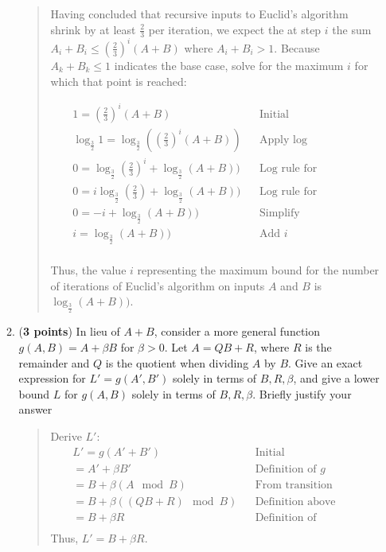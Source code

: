\documentclass[11pt]{article}
\begin{document}
\begin{enumerate}[leftmargin=*]
\begin{enumerate}
\begin{quote}
        \medskip
        Having concluded that recursive inputs to Euclid's algorithm shrink by at least $\frac{2}{3}$ per iteration, we expect the at step $i$ the sum $A_i + B_i \leq (\frac{2}{3})^i(A + B)$ where $A_i + B_i > 1$. Because $A_k + B_k \leq 1$ indicates the base case, solve for the maximum $i$ for which that point is reached:

        \begin{align*}
            && 1 = (\frac{2}{3})^i(A + B) && \text{Initial} && \\
            && \log_{\frac{3}{2}}1 = \log_{\frac{3}{2}}((\frac{2}{3})^i(A + B)) && \text{Apply log} && \\
            && 0 = \log_{\frac{3}{2}}(\frac{2}{3})^i + \log_{\frac{3}{2}}(A + B)) && \text{Log rule for multiplication} && \\
            && 0 = i\log_{\frac{3}{2}}(\frac{2}{3}) + \log_{\frac{3}{2}}(A + B)) && \text{Log rule for exponents} && \\
            && 0 = -i + \log_{\frac{3}{2}}(A + B)) && \text{Simplify} && \\
            && i = \log_{\frac{3}{2}}(A + B)) && \text{Add $i$} && \\
        \end{align*} 

        Thus, the value $i$ representing the maximum bound for the number of iterations of Euclid's algorithm on inputs $A$ and $B$ is $\log_{\frac{3}{2}}(A + B))$. 
      \end{quote}

    \item (\textbf{3 points}) In lieu of $A+B$, consider a more general function $g(A,B) = A + \beta B$ for $\beta > 0$. Let $A = QB+R$, where $R$ is the remainder and $Q$ is the quotient when dividing $A$ by $B$. Give an exact expression for $L' = g(A',B')$ solely in terms of $B,R,\beta$, and give a lower bound $L$ for $g(A,B)$ solely in terms of $B, R, \beta$. Briefly justify your answer
      \begin{quote}
        \color{purple}
        Derive $L'$:
        \begin{align*}
            && L' = g(A' + B') && \text{Initial} && \\
            && = A' + \beta B' && \text{Definition of $g$} && \\
            && = B + \beta (A \mod B) && \text{From transition relation} && \\
            && = B + \beta ((QB + R) \mod B) && \text{Definition above} && \\
            && = B + \beta R && \text{Definition of remainder} && \\
        \end{align*} 
        Thus, $L' = B + \beta R$.


\end{quote}
\end{enumerate}
\end{enumerate}
\end{document}
